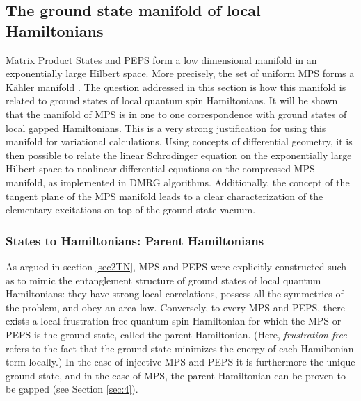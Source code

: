 \documentclass[rmp,aps,reprint,superscriptaddress,nobalancelastpage]{revtex4-1}
\begin{document}
\subsection{The ground state manifold of local Hamiltonians }

Matrix Product States and PEPS form a low dimensional manifold in an exponentially large Hilbert space. More precisely, the set of uniform MPS forms a K\"ahler manifold \cite{haegeman2014geometry}. The question addressed in this section is how this manifold is related to ground states of local quantum spin Hamiltonians. It will be shown that the manifold of MPS is in one to one correspondence with ground states of local gapped Hamiltonians. This is a very strong justification for using this manifold for variational calculations. Using concepts of differential geometry, it is then  possible to relate the linear Schrodinger equation on the exponentially large Hilbert space to nonlinear differential equations on the compressed MPS manifold, as implemented in DMRG algorithms. Additionally, the concept of the tangent plane of the MPS manifold leads to a clear characterization of the elementary excitations on top of the ground state vacuum.


\subsubsection{States to Hamiltonians: Parent Hamiltonians}

As argued in section \ref{sec2TN},  MPS and PEPS were explicitly constructed such as to mimic the entanglement structure of ground states of local quantum Hamiltonians: they have strong local correlations, possess all the symmetries of the problem, and obey an area law. Conversely, to every MPS and PEPS, there exists a local frustration-free quantum spin Hamiltonian for which the MPS or PEPS is the ground state, called the parent Hamiltonian. (Here, \emph{frustration-free} refers to the fact that the ground state minimizes the energy of each Hamiltonian term locally.) In the case of injective MPS and PEPS it is furthermore the unique ground state, and in the case of MPS, the parent Hamiltonian can be proven to be gapped (see Section \ref{sec:4}).
\end{document}
